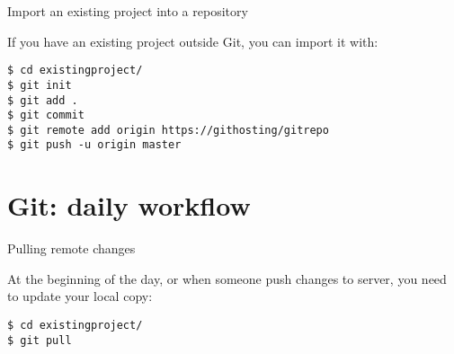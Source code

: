 \begin{frame}[c,fragile]{Import an existing project into a repository}

If you have an existing project outside Git, you can import it with:

\begin{center}
\begin{minipage}{\textwidth}

\begin{listing}[H]
\begin{verbatim}
$ cd existingproject/
$ git init
$ git add .
$ git commit
$ git remote add origin https://githosting/gitrepo
$ git push -u origin master
\end{verbatim}
\end{listing}

\end{minipage}
\end{center}

\end{frame}




\section{Git: daily workflow}

\begin{frame}[c,fragile]{Pulling remote changes}

At the beginning of the day, or when someone push changes to server, you need to
update your local copy:

\begin{center}
\begin{minipage}{\textwidth}

\begin{listing}[H]
\begin{verbatim}
$ cd existingproject/
$ git pull
\end{verbatim}
\end{listing}

\end{minipage}
\end{center}

\end{frame}



